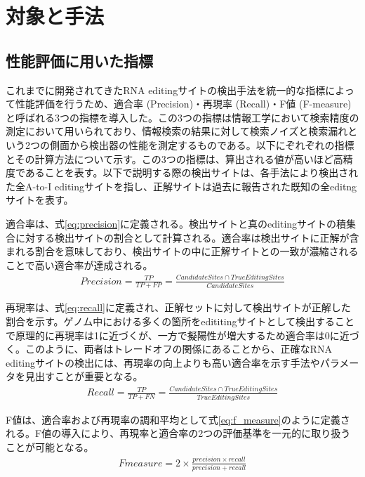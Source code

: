 \section{対象と手法}
\subsection{性能評価に用いた指標}
これまでに開発されてきたRNA editingサイトの検出手法を統一的な指標によって性能評価を行うため、適合率 (Precision)・再現率 (Recall)・F値 (F-measure)と呼ばれる3つの指標を導入した。この3つの指標は情報工学において検索精度の測定において用いられており、情報検索の結果に対して検索ノイズと検索漏れという2つの側面から検出器の性能を測定するものである。以下にぞれぞれの指標とその計算方法について示す。この3つの指標は、算出される値が高いほど高精度であることを表す。以下で説明する際の検出サイトは、各手法により検出された全A-to-I editingサイトを指し、正解サイトは過去に報告された既知の全editngサイトを表す。
\par
適合率は、式\ref{eq:precision}に定義される。検出サイトと真のeditingサイトの積集合に対する検出サイトの割合として計算される。適合率は検出サイトに正解が含まれる割合を意味しており、検出サイトの中に正解サイトとの一致が濃縮されることで高い適合率が達成される。
\begin{eqnarray}
	Precision = \frac{TP}{TP + FP} = \frac{CandidateSites \cap TrueEditingSites}{CandidateSites}
	\label{eq:precision}
\end{eqnarray}
\par
再現率は、式\ref{eq:recall}に定義され、正解セットに対して検出サイトが正解した割合を示す。ゲノム中における多くの箇所をedititingサイトとして検出することで原理的に再現率は1に近づくが、一方で擬陽性が増大するため適合率は0に近づく。このように、両者はトレードオフの関係にあることから、正確なRNA editingサイトの検出には、再現率の向上よりも高い適合率を示す手法やパラメータを見出すことが重要となる。
\begin{eqnarray}
	Recall = \frac{TP}{TP+FN}
	= \frac{CandidateSites \cap TrueEditingSites}{TrueEditingSites}
	\label{eq:recall}
\end{eqnarray}
\par
F値は、適合率および再現率の調和平均として式\ref{eq:f_measure}のように定義される。F値の導入により、再現率と適合率の2つの評価基準を一元的に取り扱うことが可能となる。
\begin{eqnarray}
	Fmeasure = 2 \times \frac{precision \times recall}{precision + recall}
	\label{eq:f_measure}
\end{eqnarray}
